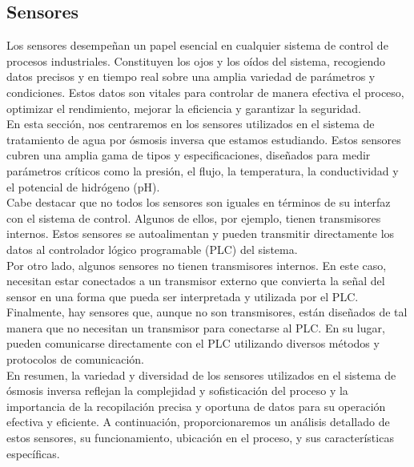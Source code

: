 

\subsection{Sensores}

Los sensores desempeñan un papel esencial en cualquier sistema de control de procesos industriales. Constituyen los ojos y los oídos del sistema, recogiendo datos precisos y en tiempo real sobre una amplia variedad de parámetros y condiciones. Estos datos son vitales para controlar de manera efectiva el proceso, optimizar el rendimiento, mejorar la eficiencia y garantizar la seguridad.\\

En esta sección, nos centraremos en los sensores utilizados en el sistema de tratamiento de agua por ósmosis inversa que estamos estudiando. Estos sensores cubren una amplia gama de tipos y especificaciones, diseñados para medir parámetros críticos como la presión, el flujo, la temperatura, la conductividad y el potencial de hidrógeno (pH).\\

Cabe destacar que no todos los sensores son iguales en términos de su interfaz con el sistema de control. Algunos de ellos, por ejemplo, tienen transmisores internos. Estos sensores se autoalimentan y pueden transmitir directamente los datos al controlador lógico programable (PLC) del sistema.\\

Por otro lado, algunos sensores no tienen transmisores internos. En este caso, necesitan estar conectados a un transmisor externo que convierta la señal del sensor en una forma que pueda ser interpretada y utilizada por el PLC.\\

Finalmente, hay sensores que, aunque no son transmisores, están diseñados de tal manera que no necesitan un transmisor para conectarse al PLC. En su lugar, pueden comunicarse directamente con el PLC utilizando diversos métodos y protocolos de comunicación.\\

En resumen, la variedad y diversidad de los sensores utilizados en el sistema de ósmosis inversa reflejan la complejidad y sofisticación del proceso y la importancia de la recopilación precisa y oportuna de datos para su operación efectiva y eficiente. A continuación, proporcionaremos un análisis detallado de estos sensores, su funcionamiento, ubicación en el proceso, y sus características específicas.\\

